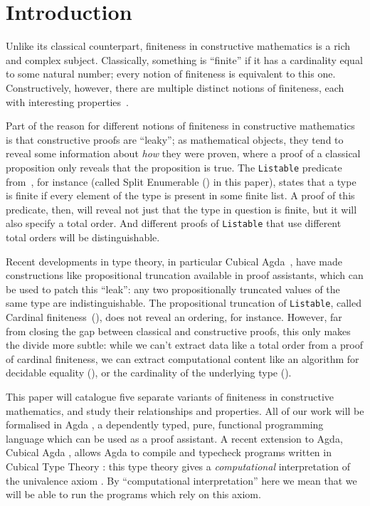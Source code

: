 \section{Introduction}
Unlike its classical counterpart, finiteness in constructive mathematics is a
rich and complex subject.
Classically, something is ``finite'' if it has a cardinality equal to some
natural number; every notion of finiteness is equivalent to this one.
Constructively, however, there are multiple distinct notions of finiteness, each
with interesting properties~\cite{coquandConstructivelyFinite2010,
  firsovVariationsNoetherianness2016, fruminFiniteSetsHomotopy2018}.

Part of the reason for different notions of finiteness in constructive
mathematics is that constructive proofs are ``leaky''; as mathematical
objects, they tend to reveal some information about \emph{how} they were proven,
where a proof of a classical proposition only reveals that the proposition is
true.
The \verb+Listable+ predicate
from~\cite{firsovDependentlyTypedProgramming2015}, for instance (called Split
Enumerable () in this paper),
states that a type is finite if every element of the type is present in some
finite list.
A proof of this predicate, then, will reveal not just that the type in question
is finite, but it will also specify a total order.
And different proofs of \verb+Listable+ that use different total orders will be
distinguishable.

Recent developments in type
theory, in particular Cubical Agda~\cite{vezzosiCubicalAgdaDependently2019},
have made constructions like propositional truncation available in proof
assistants, which
can be used to patch this ``leak'': any two propositionally truncated values of
the same type are indistinguishable.
The propositional truncation of \verb+Listable+, called Cardinal
finiteness~(), does not reveal an ordering, for instance.
However, far from closing the gap between classical and constructive proofs,
this only makes the divide more subtle: while we can't extract data like a
total order from a proof of cardinal finiteness, we can extract computational
content like an algorithm for decidable equality
(), or the cardinality of the underlying type
().

This paper will catalogue five separate variants of finiteness in constructive
mathematics, and study their relationships and properties.
All of our work will be formalised in Agda
\cite{norellDependentlyTypedProgramming2008}, a
dependently typed, pure, functional programming language which can be
used as a proof assistant.
A recent extension to Agda, Cubical Agda
\cite{vezzosiCubicalAgdaDependently2019}, allows Agda to compile and typecheck
programs written in Cubical Type Theory \cite{cohenCubicalTypeTheory2016}: this
type theory gives a \emph{computational} interpretation of the univalence axiom
\cite{hottbook}.
By ``computational interpretation'' here we mean that we will be able to run the
programs which rely on this axiom.

